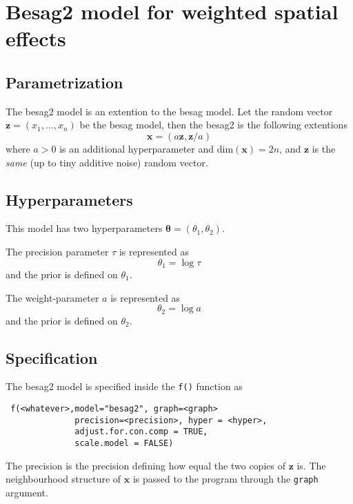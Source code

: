 \documentclass[a4paper,11pt]{article}
\begin{document}
\section*{Besag2 model for weighted spatial effects}

\subsection*{Parametrization}

The besag2 model is an extention to the besag model. Let the random
vector $\mathbf{z}=(x_1,\dots,x_n)$ be the besag model, then the
besag2 is the following extentions
\begin{displaymath}
    \mathbf{x} = (a\mathbf{z}, \mathbf{z}/a)
\end{displaymath}
where $a>0$ is an additional hyperparameter and
$\text{dim}(\mathbf{x}) = 2n$, and $\mathbf{z}$ is the \emph{same} (up
to tiny additive noise) random vector.

\subsection*{Hyperparameters}

This model has two hyperparameters $\mathbf{\theta} = (\theta_{1},
\theta_{2})$.

The precision parameter $\tau$ is represented as
\begin{displaymath}
    \theta_{1} =\log \tau
\end{displaymath}
and the prior is defined on $\theta_{1}$.

The weight-parameter $a$ is represented as
\begin{displaymath}
    \theta_{2} = \log a
\end{displaymath}
and the prior is defined on $\theta_{2}$.

\subsection*{Specification}

The besag2 model is specified inside the {\tt f()} function as
\begin{verbatim}
 f(<whatever>,model="besag2", graph=<graph>
              precision=<precision>, hyper = <hyper>,
              adjust.for.con.comp = TRUE,
              scale.model = FALSE)
\end{verbatim}

The precision is the precision defining how equal the two copies of
$\mathbf{z}$ is. The neighbourhood structure of $\mathbf{x}$ is passed
to the program through the {\tt graph} argument.
\end{document}
